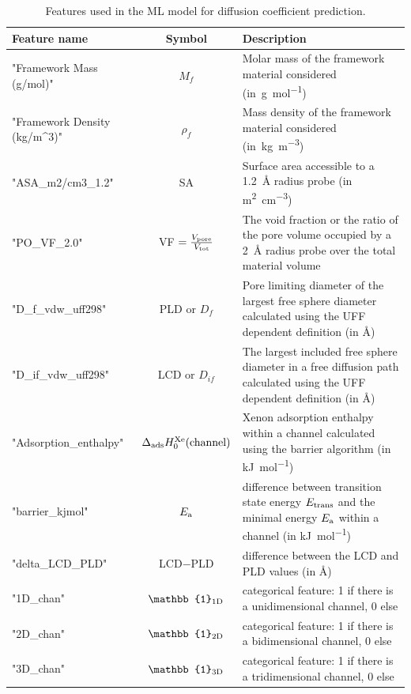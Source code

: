 \documentclass[main]{subfiles}
\begin{document}
\begin{table}[ht]
  \setlength{\extrarowheight}{1pt}
  \centering
  \begin{tabular}{|l|c|m{8cm}|}
  \hline
    Feature name  &  Symbol   &   Description\\
  \hline
      "Framework Mass (g/mol)" &   $M_f$ &   Molar mass of the framework material considered (in~\si{\g\per\mol}) \\
      "Framework Density (kg/m\textasciicircum{}3)" &   $\rho_f$ &   Mass density of the framework material considered (in~\si{\kg\per\cubic\m})  \\
      "ASA\_m2/cm3\_1.2" &   SA &   Surface area accessible to a \SI{1.2}{\angstrom} radius probe (in \si{\square\m\per\cubic\cm})  \\
      "PO\_VF\_2.0" &  VF $= \tfrac{V_{\text{pore}}}{V_{\text{tot}}}$ &  The void fraction or the ratio of the pore volume occupied by a \SI{2}{\angstrom} radius probe over the total material volume  \\
      "D\_f\_vdw\_uff298" &   PLD or $D_f$  &   Pore limiting diameter of the largest free sphere diameter calculated using the UFF dependent definition (in \si{\angstrom}) \\
      "D\_if\_vdw\_uff298" &   LCD or $D_{if}$ &   The largest included free sphere diameter in a free diffusion path calculated using the UFF dependent definition (in \si{\angstrom}) \\
      "Adsorption\_enthalpy" &   $\Delta_{\text{ads}}H_0^{\text{Xe}}(\text{channel})$  &   Xenon adsorption enthalpy within a channel calculated using the barrier algorithm (in \si{\kJ\per\mol}) \\
      "barrier\_kjmol" &   $E_{\text{a}}$  &   difference between transition state energy $E_{\text{trans}}$ and the minimal energy $E_{\text{a}}$ within a channel (in \si{\kJ\per\mol}) \\
      "delta\_LCD\_PLD" &   LCD$-$PLD  &   difference between the LCD and PLD values (in \si{\angstrom}) \\
      "1D\_chan" &  $\mathbb{1}\e{1D}$   &   categorical feature: 1 if there is a unidimensional channel, 0 else \\
      "2D\_chan" &  $\mathbb{1}\e{2D}$   &   categorical feature: 1 if there is a bidimensional channel, 0 else \\
      "3D\_chan" &  $\mathbb{1}\e{3D}$   &   categorical feature: 1 if there is a tridimensional channel, 0 else \\
    \hline
  \end{tabular}
  \caption{ Features used in the ML model for diffusion coefficient prediction. }\label{Table:feat_diff}
\end{table}
\end{document}
